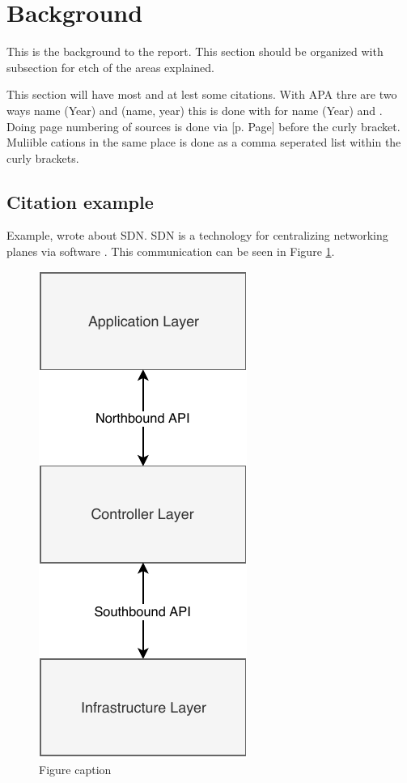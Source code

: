
\section{Background}

This is the background to the report. This section should be organized with subsection for etch of the areas explained.

This section will have most and at lest some citations. With APA thre are two ways name (Year) and (name, year) this is done with  for name (Year) and . Doing page numbering of sources is done via [p. Page] before the curly bracket. Muliible cations in the same place is done as a comma seperated list within the curly brackets.




\subsection{Citation example}
Example, \textcite[p. 321]{ieeeSDN} wrote about SDN. SDN is a technology for centralizing networking planes via software \parencites[p. 123]{RoadtoieeeSDN}[p. 123]{ieeeSDN, Roadto}. This communication can be seen in Figure \ref{figureRefenceName}.


\begin{figure}[h]
	\centering
	\includegraphics[width=0.25 \textwidth]{./pics/APIlayers.pdf}
	\caption{Figure caption}
    \label{figureRefenceName}
\end{figure}





